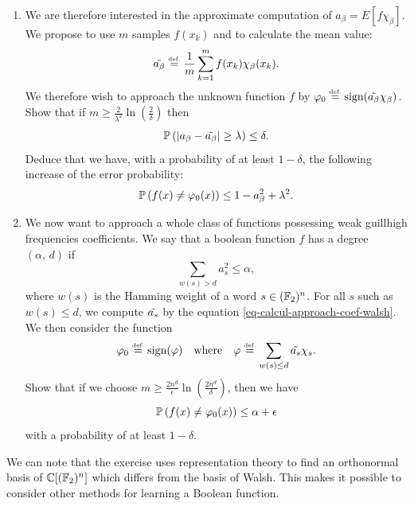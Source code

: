 \begin{exo}
\begin{enumerate}
\item We are therefore interested in the approximate computation of $ a_\beta = E [f \chi_\beta] $. We propose to use $ m $ samples $ f(x_k) $ and to calculate the mean value:
\begin{equation}
\label{eq-calcul-approach-coef-walsh}
\tilde{a_{\beta}} \stackrel{\mbox{\upshape\tiny def.}}{=} \frac{1}{m} \sum_{k = 1}^m{f(x_k) \chi_\beta (x_k)}.
\end{equation}
We therefore wish to approach the unknown function $ f $ by $ \varphi_0 \stackrel{\mbox{\upshape\tiny def.}}{=} \operatorname{sign} (\tilde{a_\beta} \chi_\beta) $. Show that if $ m \geq \frac{2}{\lambda^2} \ln \left(\frac{2}{\delta} \right) $ then
\begin{equation*}
\mathbb{P} \left(\left| a_\beta - \tilde{a_\beta} \right| \geq \lambda \right) \leq \delta.
\end{equation*}
Deduce that we have, with a probability of at least $ 1- \delta $, the following increase of the error probability:
\begin{equation*}
\mathbb{P} \left(f(x) \neq \varphi_0 (x) \right) \leq 1 - a_\beta^2 + \lambda^2.
\end{equation*}
 
\item We now want to approach a whole class of functions possessing weak \-guill{high frequencies} coefficients. We say that a boolean function $ f $ has a degree $ (\alpha, \, d) $ if
\begin{equation*}
\sum_{w (s)> d}{a_s^2} \leq \alpha,
\end{equation*}
where $ w (s) $ is the Hamming weight of a word $ s \in (\mathbb{F}_2)^n $. For all $ s $ such as $ w (s) \leq d $, we compute $ \tilde{a_s} $ by the equation \eqref{eq-calcul-approach-coef-walsh}. We then consider the function
\begin{equation*}
\varphi_0 \stackrel{\mbox{\upshape\tiny def.}}{=} \operatorname{sign} (\varphi) \quad \text{where} \quad \varphi \stackrel{\mbox{\upshape\tiny def.}}{=} \sum_{w (s) \leq d}{\tilde{a_s} \chi_s}.
\end{equation*}
Show that if we choose $ m \geq \frac{2 n^d}{\epsilon} \ln \left(\frac{2 n^d}{\delta} \right) $, then we have
\begin{equation*}
\mathbb{P} \left(f(x) \neq \varphi_0 (x) \right) \leq \alpha + \epsilon
\end{equation*}
with a probability of at least $ 1- \delta $.
\end{enumerate} We can note that the exercise  uses representation theory to find an orthonormal basis of $ \mathbb{C} [(\mathbb{F}_2)^n] $ which differs from the basis of Walsh. This makes it possible to consider other methods for learning a Boolean function.
\end{exo}
 
